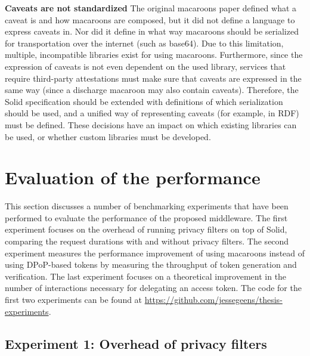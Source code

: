 \noindent \textbf{Caveats are not standardized} The original macaroons paper defined what a caveat is and how macaroons are composed, but it did not define a language to express caveats in. Nor did it define in what way macaroons should be serialized for transportation over the internet (such as base64). Due to this limitation, multiple, incompatible libraries exist for using macaroons. Furthermore, since the expression of caveats is not even dependent on the used library, services that require third-party attestations must make sure that caveats are expressed in the same way (since a discharge macaroon may also contain caveats). Therefore, the Solid specification should be extended with definitions of which serialization should be used, and a unified way of representing caveats (for example, in \gls{RDF}) must be defined. These decisions have an impact on which existing libraries can be used, or whether custom libraries must be developed.


\section{Evaluation of the performance}
This section discusses a number of benchmarking experiments that have been performed to evaluate the performance of the proposed middleware. The first experiment focuses on the overhead of running privacy filters on top of Solid, comparing the request durations with and without privacy filters. The second experiment measures the performance improvement of using macaroons instead of using \gls{DPoP}-based tokens by measuring the throughput of token generation and verification. The last experiment focuses on a theoretical improvement in the number of interactions necessary for delegating an access token. The code for the first two experiments can be found at \url{https://github.com/jessegeens/thesis-experiments}.

\subsection{Experiment 1: Overhead of privacy filters}
\label{sec:privacy-filter-performance}
